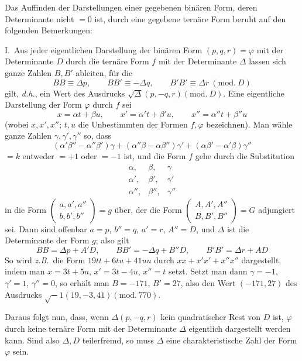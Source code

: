 Das Auffinden der Darstellungen einer gegebenen binären Form, deren
Determinante nicht $=0$ ist,
durch eine gegebene ternäre Form beruht auf den folgenden Bemerkungen:

I.\ Aus jeder eigentlichen Darstellung der binären Form $(p,q,r)=\varphi$ mit der
Determinante $D$ durch die ternäre Form $f$ mit der Determinante
$\Delta$ lassen sich ganze Zahlen $B,B'$ ableiten, für die
\[
BB\equiv\Delta p,\qquad BB'\equiv-\Delta q,\qquad
B'B'\equiv\Delta r\ (\mathrm{mod.}\ D)
\]
gilt, \textit{d.h.}, ein Wert des Ausdrucks $\surd\Delta(p,\allowbreak -q,\allowbreak r)(\mathrm{mod.}\ D)$.
Eine eigentliche Darstellung der Form $\varphi$ durch $f$ sei
\[
x=\alpha t+\beta u,\qquad x'=\alpha't+\beta'u,\qquad x''=\alpha''t+\beta''u
\]
(wobei $x,x',x''$; $t,u$ die Unbestimmten der Formen $f,\varphi$ bezeichnen).
Man wähle ganze Zahlen $\gamma,\gamma',\gamma''$ so, dass
\[
(\alpha'\beta''-\alpha''\beta')\gamma+
(\alpha''\beta-\alpha\beta'')\gamma'+
(\alpha\beta'-\alpha'\beta)\gamma''
\]
$=k$ entweder $=+1$ oder $=-1$ ist, und die Form $f$ gehe
durch die Substitution
\[
\begin{array}{ccc}
\alpha,&\beta,&\gamma\\
\alpha',&\beta',&\gamma'\\
\alpha'',&\beta'',&\gamma''
\end{array}
\]
in die Form
$\left(\begin{smallmatrix}a,a',a''\\b,b',b''\end{smallmatrix}\right)=g$
über, der die Form
$\left(\begin{smallmatrix}A,A',A''\\B,B',B''\end{smallmatrix}\right)=G$
adjungiert sei. Dann sind offenbar $a=p$, $b''=q$, $a'=r$, $A''=D$,
und $\Delta$ ist die Determinante der Form $g$; also gilt
\[
BB=\Delta p+A'D,\qquad BB'=-\Delta q+B''D,\qquad B'B'=\Delta r+AD
\]
So wird \textit{z.B.}\ die Form $19tt+6tu+41uu$ durch $xx+x'x'+x''x''$ dargestellt,
indem man $x=3t+5u$, $x'=3t-4u$, $x''=t$ setzt. Setzt man dann $\gamma=-1$,
$\gamma'=1$, $\gamma''=0$,
so erhält man $B=-171$, $B'=27$, also den Wert $(-171,27)$ des Ausdrucks
$\surd-1(19,\allowbreak -3,\allowbreak 41)(\mathrm{mod.}\ 770)$.

Daraus folgt nun, dass, wenn $\Delta(p,-q,r)$ kein quadratischer Rest von $D$
ist, $\varphi$ durch keine ternäre Form mit der Determinante $\Delta$
eigentlich dargestellt werden kann. Sind also $\Delta,D$ teilerfremd,
so muss $\Delta$ eine charakteristische Zahl der Form $\varphi$ sein.


